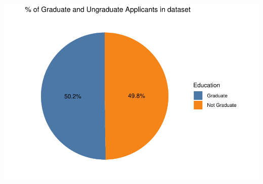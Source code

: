 \documentclass[
]{article}
\begin{document}
\includegraphics{Loan_approval_files/figure-latex/unnamed-chunk-15-1.pdf}
\end{document}
